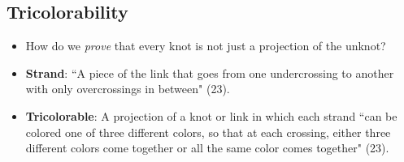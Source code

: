 \documentclass[titlepage]{article}
\numberwithin{figure}{section}
\numberwithin{table}{section}
\numberwithin{equation}{section}
\newcommand{\dq}[2]{``#1" (#2).}
\begin{document}
\subsection{Tricolorability}\label{sss:tricolor}
\begin{itemize}
    \item How do we \emph{prove} that every knot is not just a projection of the unknot?
    \item \textbf{Strand}: \dq{A piece of the link that goes from one undercrossing to another with only overcrossings in between}{23}
    \item \textbf{Tricolorable}: A projection of a knot or link in which each strand \dq{can be colored one of three different colors, so that at each crossing, either three different colors come together or all the same color comes together}{23}
    \begin{figure}[h!]
        \centering
\end{figure}
\end{itemize}
\end{document}
